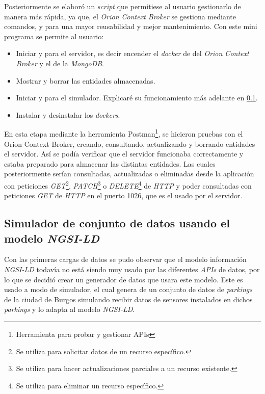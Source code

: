 Posteriormente se elaboró un \textit{script} que permitiese al usuario gestionarlo de manera más rápida, ya que, el \textit{Orion Context Broker} se gestiona mediante comandos, y para una mayor reusabilidad y mejor mantenimiento.
Con este mini programa se permite al usuario:
\begin{itemize}
    \item Iniciar y para el servidor, es decir encender el \textit{docker} de del \textit{Orion Context Broker} y el de la \textit{MongoDB}.
    \item Mostrar y borrar las entidades almacenadas.
    \item Iniciar y para el simulador. Explicaré su funcionamiento más adelante en \ref{simulador}.
    \item Instalar y desinstalar los \textit{dockers}.
\end{itemize}


En esta etapa mediante la herramienta Postman\footnote{Herramienta para probar y gestionar APIs}, se hicieron pruebas con el Orion Context Broker, creando, consultando, actualizando y borrando entidades el servidor. Así se podía verificar que el servidor funcionaba correctamente y estaba preparado para almacenar las distintas entidades.
Las cuales posteriormente serían consultadas, actualizadas o eliminadas desde la aplicación con peticiones \textit{GET}\footnote{Se utiliza para solicitar datos de un recurso específico.}, \textit{PATCH}\footnote{Se utiliza para hacer actualizaciones parciales a un recurso existente.} o \textit{DELETE}\footnote{Se utiliza para eliminar un recurso específico.} de \textit{HTTP} y poder consultadas con peticiones \textit{GET} de \textit{HTTP} en el puerto 1026, que es el usado por el servidor.
\label{fig:post-postman}

\subsection{Simulador de conjunto de datos usando el modelo \textit{NGSI-LD}}\label{simulador}

Con las primeras cargas de datos se pudo observar que el modelo información \textit{NGSI-LD} todavía no está siendo muy usado por las diferentes \textit{APIs} de datos, por lo que se decidió crear un generador de datos que usara este modelo. Este es usado a modo de simulador, el cual genera de un conjunto de datos de \textit{parkings} de la ciudad de Burgos simulando recibir datos de sensores instalados en dichos \textit{parkings} y lo adapta al modelo \textit{NGSI-LD}. 

